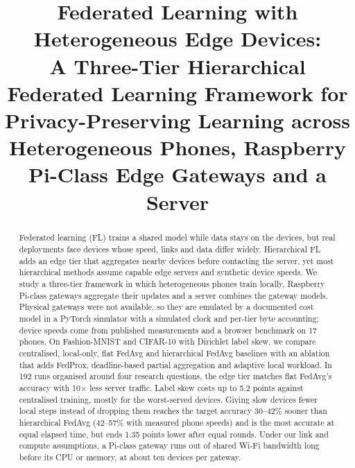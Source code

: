 \documentclass[conference]{IEEEtran}
\begin{document}
\title{Federated Learning with Heterogeneous Edge Devices:\\
\Large A Three-Tier Hierarchical Federated Learning Framework for Privacy-Preserving Learning across Heterogeneous Phones, Raspberry Pi-Class Edge Gateways and a Server}

\author{
\and
{}
}

\maketitle

\begin{abstract}
Federated learning (FL) trains a shared model while data stays on the devices, but real deployments face devices whose speed, links and data differ widely. Hierarchical FL adds an edge tier that aggregates nearby devices before contacting the server, yet most hierarchical methods assume capable edge servers and synthetic device speeds. We study a three-tier framework in which heterogeneous phones train locally, Raspberry Pi-class gateways aggregate their updates and a server combines the gateway models. Physical gateways were not available, so they are emulated by a documented cost model in a PyTorch simulator with a simulated clock and per-tier byte accounting; device speeds come from published measurements and a browser benchmark on 17 phones. On Fashion-MNIST and CIFAR-10 with Dirichlet label skew, we compare centralised, local-only, flat FedAvg and hierarchical FedAvg baselines with an ablation that adds FedProx, deadline-based partial aggregation and adaptive local workload. In 192 runs organised around four research questions, the edge tier matches flat FedAvg's accuracy with 10$\times$ less server traffic. Label skew costs up to 5.2 points against centralised training, mostly for the worst-served devices. Giving slow devices fewer local steps instead of dropping them reaches the target accuracy 30--42\% sooner than hierarchical FedAvg (42--57\% with measured phone speeds) and is the most accurate at equal elapsed time, but ends 1.35 points lower after equal rounds. Under our link and compute assumptions, a Pi-class gateway runs out of shared Wi-Fi bandwidth long before its CPU or memory, at about ten devices per gateway.
\end{abstract}
\end{document}

